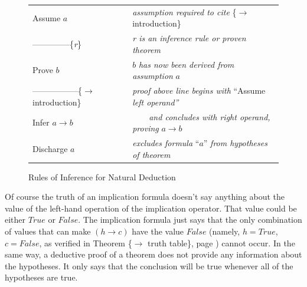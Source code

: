 \begin{figure}
\begin{center}
\begin{tabular}{ll}
Assume $a$                                      & \emph{assumption required to cite} \{$\rightarrow$ introduction\}     \\
--------------\{\emph{r}\}                      & \emph{r is an inference rule or proven theorem}                       \\
Prove $b$                                       & $b$ \emph{has now been derived from assumption} $a$                   \\
-----------------\{$\rightarrow$ introduction\} & \emph{proof above line begins with} ``Assume \emph{left operand''}    \\
Infer $a \rightarrow b$                         & ~~~~\emph{and concludes with right operand, proving} $a \rightarrow b$\\
Discharge $a$                                   & \emph{excludes formula} ``$a$'' \emph{from hypotheses of theorem}     \\
\end{tabular}
\end{center}
\caption{Rules of Inference for Natural Deduction}
\label{fig-02-deduction-rules}
\end{figure}

Of course the truth of an implication formula doesn't
say anything about the value of the
left-hand operation of the implication operator.
That value could be either $True$ or $False$.
The implication formula just says that
the only combination of values that can make
$(h \rightarrow c)$ have the value $False$
(namely, $h = True$, $c = False$, as verified in
Theorem \{$\rightarrow$ truth table\},
page \pageref{implication-truth-table}) cannot occur.
In the same way, a deductive proof of a theorem
does not provide any information about the hypotheses.
It only says that the conclusion will be true
whenever all of the hypotheses are true.

